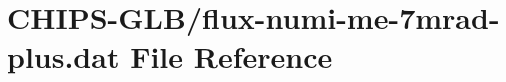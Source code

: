 \hypertarget{flux-numi-me-7mrad-plus_8dat}{}\section{C\+H\+I\+P\+S-\/\+G\+L\+B/flux-\/numi-\/me-\/7mrad-\/plus.dat File Reference}
\label{flux-numi-me-7mrad-plus_8dat}
